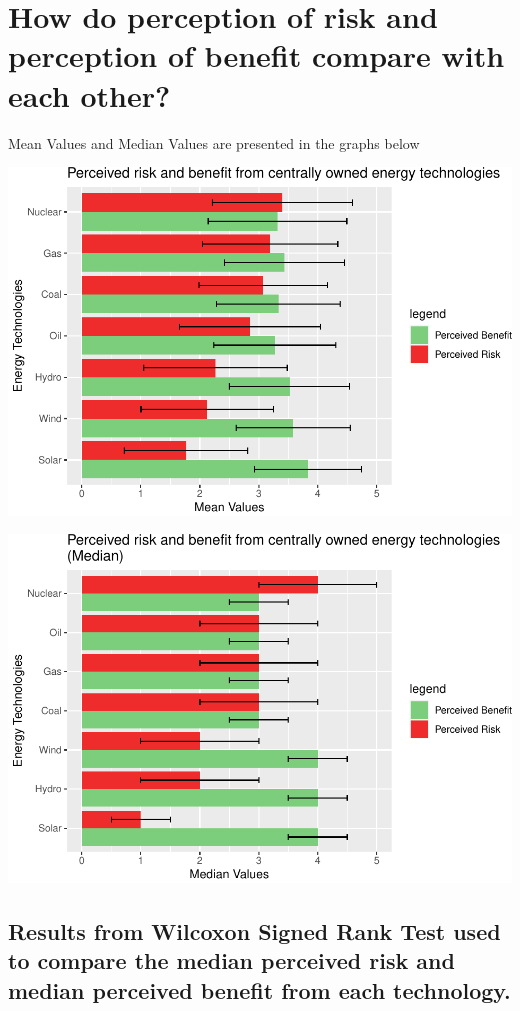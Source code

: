 \documentclass[
]{article}
\begin{document}
\newpage

\hypertarget{how-do-perception-of-risk-and-perception-of-benefit-compare-with-each-other}{%
\section{How do perception of risk and perception of benefit compare
with each
other?}\label{how-do-perception-of-risk-and-perception-of-benefit-compare-with-each-other}}

Mean Values and Median Values are presented in the graphs below

\includegraphics{Significant_results_files/figure-latex/unnamed-chunk-12-1.pdf}

\includegraphics{Significant_results_files/figure-latex/unnamed-chunk-13-1.pdf}

\hypertarget{results-from-wilcoxon-signed-rank-test-used-to-compare-the-median-perceived-risk-and-median-perceived-benefit-from-each-technology.}{%
\subsection{Results from Wilcoxon Signed Rank Test used to compare the
median perceived risk and median perceived benefit from each
technology.}\label{results-from-wilcoxon-signed-rank-test-used-to-compare-the-median-perceived-risk-and-median-perceived-benefit-from-each-technology.}}
\end{document}
